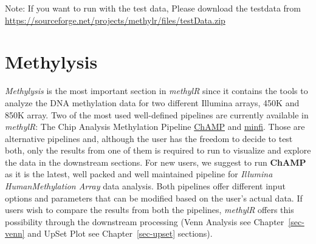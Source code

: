 \documentclass[
  a4paper,
  DIV=11,
  numbers=noendperiod,
  oneside,
  open=any]{scrreport}
\begin{document}
\begin{tcolorbox}[enhanced jigsaw, breakable, colback=white, colbacktitle=quarto-callout-note-color!10!white, opacityback=0, left=2mm, bottomrule=.15mm, opacitybacktitle=0.6, coltitle=black, bottomtitle=1mm, toprule=.15mm, toptitle=1mm, arc=.35mm, titlerule=0mm, rightrule=.15mm, title=\textcolor{quarto-callout-note-color}{\faInfo}\hspace{0.5em}{Note}, colframe=quarto-callout-note-color-frame, leftrule=.75mm]

Note: If you want to run with the test data, Please download the
testdata from
\url{https://sourceforge.net/projects/methylr/files/testData.zip}

\end{tcolorbox}

\chapter{Methylysis}\label{sec-methylysis}

\emph{Methylysis} is the most important section in \emph{methylR} since
it contains the tools to analyze the DNA methylation data for two
different Illumina arrays, 450K and 850K array. Two of the most used
well-defined pipelines are currently available in \emph{methylR}: The
Chip Analysis Methylation Pipeline
\href{https://bioconductor.org/packages/release/bioc/vignettes/ChAMP/inst/doc/ChAMP.html}{ChAMP}
and
\href{https://bioconductor.org/packages/release/bioc/vignettes/minfi/inst/doc/minfi.html}{minfi}.
Those are alternative pipelines and, although the user has the freedom
to decide to test both, only the results from one of them is required to
run to visualize and explore the data in the downstream sections. For
new users, we suggest to run \textbf{ChAMP} as it is the latest, well
packed and well maintained pipeline for \emph{Illumina HumanMethylation
Array} data analysis. Both pipelines offer different input options and
parameters that can be modified based on the user's actual data. If
users wish to compare the results from both the pipelines,
\emph{methylR} offers this possibility through the downstream processing
(Venn Analysis see Chapter~\ref{sec-venn} and UpSet Plot see
Chapter~\ref{sec-upset} sections).
\end{document}
